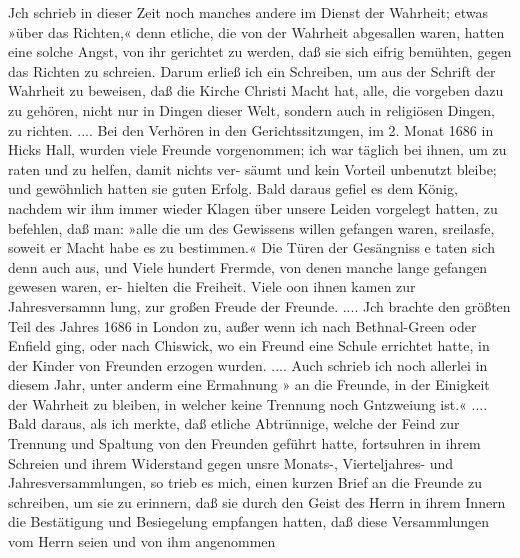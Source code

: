 Jch schrieb in dieser Zeit noch manches andere im Dienst
der Wahrheit; etwas »über das Richten,« denn etliche, die von
der Wahrheit abgesallen waren, hatten eine solche Angst, von ihr
gerichtet zu werden, daß sie sich eifrig bemühten, gegen das Richten
zu schreien. Darum erließ ich ein Schreiben, um aus der Schrift
der Wahrheit zu beweisen, daß die Kirche Christi Macht hat, alle,
die vorgeben dazu zu gehören, nicht nur in Dingen dieser Welt,
sondern auch in religiösen Dingen, zu richten. ....
Bei den Verhören in den Gerichtssitzungen, im 2. Monat 1686
in Hicks Hall, wurden viele Freunde vorgenommen; ich war
täglich bei ihnen, um zu raten und zu helfen, damit nichts ver-
säumt und kein Vorteil unbenutzt bleibe; und gewöhnlich hatten
sie guten Erfolg. Bald daraus gefiel es dem König, nachdem
wir ihm immer wieder Klagen über unsere Leiden vorgelegt hatten,
zu befehlen, daß man: »alle die um des Gewissens willen gefangen
waren, sreilasfe, soweit er Macht habe es zu bestimmen.« Die
Türen der Gesängniss e taten sich denn auch aus, und Viele hundert
Frermde, von denen manche lange gefangen gewesen waren, er-
hielten die Freiheit. Viele oon ihnen kamen zur Jahresversamnn
lung, zur großen Freude der Freunde. ....
Jch brachte den größten Teil des Jahres 1686 in London
zu, außer wenn ich nach Bethnal-Green oder Enfield ging, oder
nach Chiswick, wo ein Freund eine Schule errichtet hatte, in der
Kinder von Freunden erzogen wurden.
.... Auch schrieb ich noch allerlei in diesem Jahr, unter anderm
eine Ermahnung » an die Freunde, in der Einigkeit der Wahrheit zu
bleiben, in welcher keine Trennung noch Gntzweiung ist.« ....
Bald daraus, als ich merkte, daß etliche Abtrünnige, welche
der Feind zur Trennung und Spaltung von den Freunden geführt
hatte, fortsuhren in ihrem Schreien und ihrem Widerstand gegen
unsre Monats-, Vierteljahres- und Jahresversammlungen, so trieb
es mich, einen kurzen Brief an die Freunde zu schreiben, um sie zu
erinnern, daß sie durch den Geist des Herrn in ihrem Innern
die Bestätigung und Besiegelung empfangen hatten, daß diese
Versammlungen vom Herrn seien und von ihm angenommen


